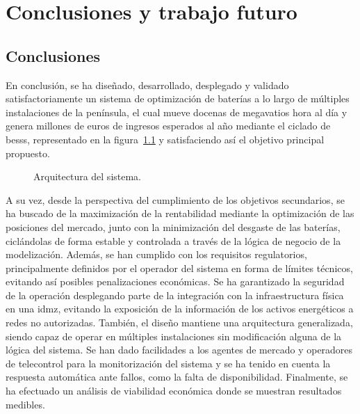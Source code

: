 \cleardoublepage

\chapter{Conclusiones y trabajo futuro}
\label{makereference8}

\section{Conclusiones}
\label{makereference8.1}

En conclusión, se ha diseñado, desarrollado, desplegado y validado satisfactoriamente un sistema de optimización de baterías a lo largo de múltiples instalaciones de la península, el cual mueve docenas de megavatios hora al día y genera millones de euros de ingresos esperados al año mediante el ciclado de \glspl{bess}, representado en la figura~\ref{fig:arquitectura-sistema} y satisfaciendo así el objetivo principal propuesto.

\begin{figure}
  \centering
  \caption[Arquitectura del sistema.]{Arquitectura del sistema.}
  \label{fig:arquitectura-sistema}
\end{figure}

A su vez, desde la perspectiva del cumplimiento de los objetivos secundarios, se ha buscado de la maximización de la rentabilidad mediante la optimización de las posiciones del mercado, junto con la minimización del desgaste de las baterías, ciclándolas de forma estable y controlada a través de la lógica de negocio de la modelización. Además, se han cumplido con los requisitos regulatorios, principalmente definidos por el operador del sistema en forma de límites técnicos, evitando así posibles penalizaciones económicas. Se ha garantizado la seguridad de la operación desplegando parte de la integración con la infraestructura física en una \gls{idmz}, evitando la exposición de la información de los activos energéticos a redes no autorizadas. También, el diseño mantiene una arquitectura generalizada, siendo capaz de operar en múltiples instalaciones sin modificación alguna de la lógica del sistema. Se han dado facilidades a los agentes de mercado y operadores de telecontrol para la monitorización del sistema y se ha tenido en cuenta la respuesta automática ante fallos, como la falta de disponibilidad. Finalmente, se ha efectuado un análisis de viabilidad económica donde se muestran resultados medibles.

